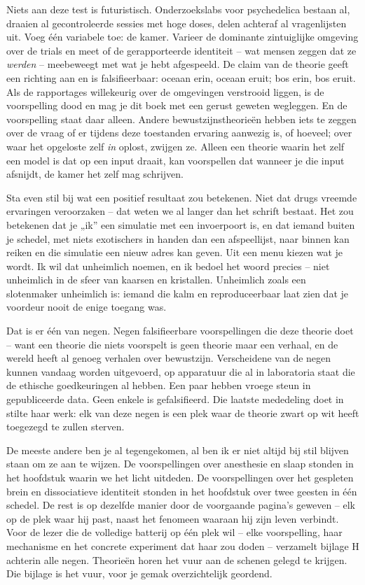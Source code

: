 \documentclass[11pt, twoside, openright]{book}
\begin{document}
Niets aan deze test is futuristisch. Onderzoekslabs voor psychedelica bestaan al, draaien al gecontroleerde sessies met hoge doses, delen achteraf al vragenlijsten uit. Voeg één variabele toe: de kamer. Varieer de dominante zintuiglijke omgeving over de trials en meet of de gerapporteerde identiteit -- wat mensen zeggen dat ze \textit{werden} -- meebeweegt met wat je hebt afgespeeld. De claim van de theorie geeft een richting aan en is falsifieerbaar: oceaan erin, oceaan eruit; bos erin, bos eruit. Als de rapportages willekeurig over de omgevingen verstrooid liggen, is de voorspelling dood en mag je dit boek met een gerust geweten wegleggen. En de voorspelling staat daar alleen. Andere bewustzijnstheorieën hebben iets te zeggen over de vraag of er tijdens deze toestanden ervaring aanwezig is, of hoeveel; over waar het opgeloste zelf \textit{in} oplost, zwijgen ze. Alleen een theorie waarin het zelf een model is dat op een input draait, kan voorspellen dat wanneer je die input afsnijdt, de kamer het zelf mag schrijven.

Sta even stil bij wat een positief resultaat zou betekenen. Niet dat drugs vreemde ervaringen veroorzaken -- dat weten we al langer dan het schrift bestaat. Het zou betekenen dat je „ik” een simulatie met een invoerpoort is, en dat iemand buiten je schedel, met niets exotischers in handen dan een afspeellijst, naar binnen kan reiken en die simulatie een nieuw adres kan geven. Uit een menu kiezen wat je wordt. Ik wil dat unheimlich noemen, en ik bedoel het woord precies -- niet unheimlich in de sfeer van kaarsen en kristallen. Unheimlich zoals een slotenmaker unheimlich is: iemand die kalm en reproduceerbaar laat zien dat je voordeur nooit de enige toegang was.

Dat is er één van negen. Negen falsifieerbare voorspellingen die deze theorie doet -- want een theorie die niets voorspelt is geen theorie maar een verhaal, en de wereld heeft al genoeg verhalen over bewustzijn. Verscheidene van de negen kunnen vandaag worden uitgevoerd, op apparatuur die al in laboratoria staat die de ethische goedkeuringen al hebben. Een paar hebben vroege steun in gepubliceerde data. Geen enkele is gefalsifieerd. Die laatste mededeling doet in stilte haar werk: elk van deze negen is een plek waar de theorie zwart op wit heeft toegezegd te zullen sterven.

De meeste andere ben je al tegengekomen, al ben ik er niet altijd bij stil blijven staan om ze aan te wijzen. De voorspellingen over anesthesie en slaap stonden in het hoofdstuk waarin we het licht uitdeden. De voorspellingen over het gespleten brein en dissociatieve identiteit stonden in het hoofdstuk over twee geesten in één schedel. De rest is op dezelfde manier door de voorgaande pagina's geweven -- elk op de plek waar hij past, naast het fenomeen waaraan hij zijn leven verbindt. Voor de lezer die de volledige batterij op één plek wil -- elke voorspelling, haar mechanisme en het concrete experiment dat haar zou doden -- verzamelt bijlage H achterin alle negen. Theorieën horen het vuur aan de schenen gelegd te krijgen. Die bijlage is het vuur, voor je gemak overzichtelijk geordend.
\end{document}
